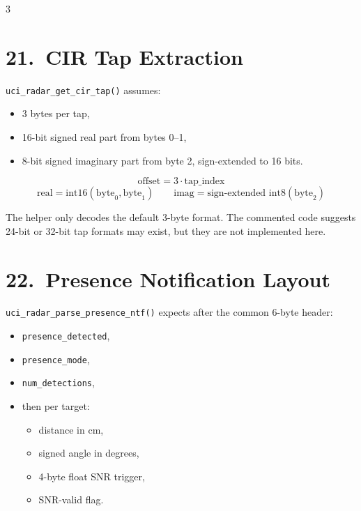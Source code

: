 \documentclass[10pt]{article}
\begin{document}
\begin{multicols*}{3}
\section*{21.\ CIR Tap Extraction}

\texttt{uci\_radar\_get\_cir\_tap()} assumes:
\begin{itemize}
  \item 3 bytes per tap,
  \item 16-bit signed real part from bytes 0--1,
  \item 8-bit signed imaginary part from byte 2, sign-extended to 16 bits.
\end{itemize}

\begin{tcolorbox}[formulabox={Tap Interpretation}]
\[
\text{offset} = 3 \cdot \text{tap\_index}
\]
\[
\text{real} = \text{int16}(\text{byte}_0,\text{byte}_1)
\qquad
\text{imag} = \text{sign-extended int8}(\text{byte}_2)
\]
\end{tcolorbox}

\begin{tcolorbox}[warnbox={Implementation Assumption}]
The helper only decodes the default 3-byte format.
The commented code suggests 24-bit or 32-bit tap formats may exist, but they are not implemented here.
\end{tcolorbox}

\section*{22.\ Presence Notification Layout}

\texttt{uci\_radar\_parse\_presence\_ntf()} expects after the common 6-byte header:
\begin{itemize}
  \item \texttt{presence\_detected},
  \item \texttt{presence\_mode},
  \item \texttt{num\_detections},
  \item then per target:
  \begin{itemize}
    \item distance in cm,
    \item signed angle in degrees,
    \item 4-byte float SNR trigger,
    \item SNR-valid flag.
  \end{itemize}
\end{itemize}


\end{multicols*}
\end{document}
